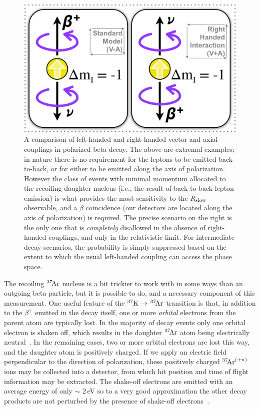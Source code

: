\begin{figure}[h!t!b!]
	\centering
	\includegraphics[width=.999\linewidth]{Figures/RHC.png}
	\caption[A Comparison of Left-Handed and Right-Handed Couplings]{A comparison of left-handed and right-handed vector and axial couplings in polarized beta decay.  The above are extremal examples;  in nature there is no requirement for the leptons to be emitted back-to-back, or for either to be emitted along the axis of polarization.  However the class of events with minimal momentum allocated to the recoiling daughter nucleus (i.e., the result of back-to-back lepton emission) is what provides the most sensitivity to the $R_{\textrm{slow}}$ observable, and a $\beta$ coincidence (our detectors are located along the axis of polarization) is required.
	The precise scenario on the right is the only one that is \emph{completely} disallowed in the absence of right-handed couplings, and only in the relativistic limit.  For intermediate decay scenarios, the probability is simply suppressed based on the extent to which the usual left-handed coupling can access the phase space.  
	\label{fig:rhc}
	}
\end{figure}

The recoiling $^{37}\textrm{\!Ar}$ nucleus is a bit trickier to work with in some ways than an outgoing beta particle, but it is possible to do, and a necessary component of this measurement.  One useful feature of the $^{37}\textrm{K} \rightarrow \,^{37}\textrm{\!Ar}$ transition is that, in addition to the $\beta^+$ emitted in the decay itself, one or more \emph{orbital} electrons from the parent atom are typically lost.  In the majority of decay events only one orbital electron is shaken off, which results in the daughter $^{37}\textrm{\!Ar}$ atom being electrically neutral~\cite{gorelov2000,dan_thesis}.  In the remaining cases, two or more orbital electrons are lost this way, and the daughter atom is positively charged.  If we apply an electric field perpendicular to the direction of polarization, these positively charged $^{37}\textrm{\!Ar}^{(+n)}$ ions may be collected into a detector, from which hit position and time of flight information may be extracted.  The shake-off electrons are emitted with an average energy of only $\sim$ 2\,eV so to a very good approximation the other decay products are not perturbed by the presence of shake-off electrons~\cite{Levinger}.  

